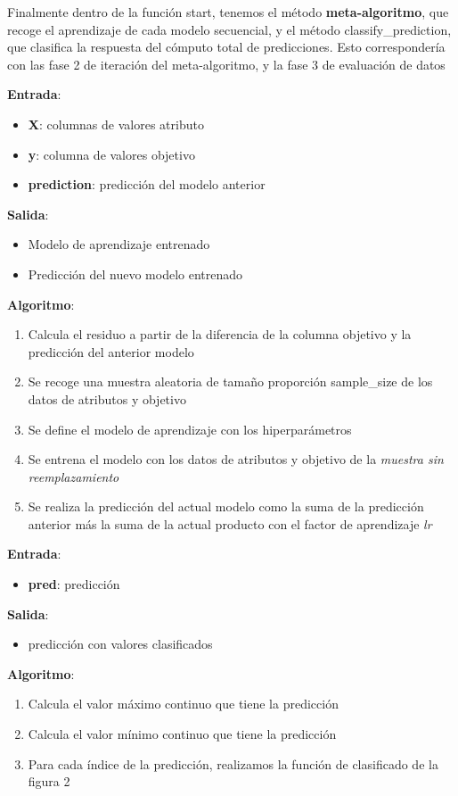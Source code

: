 \documentclass[conference,a4paper]{IEEEtran}
\begin{document}
Finalmente dentro de la función start, tenemos el método \textbf{meta-algoritmo}, que recoge el aprendizaje de cada modelo secuencial, y el método classify\_prediction, que clasifica la respuesta del cómputo total de predicciones. Esto correspondería con las fase 2 de iteración del meta-algoritmo, y la fase 3 de evaluación de datos \\

\begin{textb}
    \textbf{Entrada}:
    \begin{itemize}
    \item \textbf{X}: columnas de valores atributo
    \item \textbf{y}: columna de valores objetivo
    \item \textbf{prediction}: predicción del modelo anterior
\end{itemize}
\textbf{Salida}:
\begin{itemize}
    \item Modelo de aprendizaje entrenado
    \item Predicción del nuevo modelo entrenado
\end{itemize}
\textbf{Algoritmo}:
\begin{enumerate}
    \item Calcula el residuo a partir de la diferencia de la columna objetivo y la predicción del anterior modelo
    \item Se recoge una muestra aleatoria de tamaño proporción sample\_size de los datos de atributos y objetivo
    \item Se define el modelo de aprendizaje con los hiperparámetros
    \item Se entrena el modelo con los datos de atributos y objetivo de la \textit{muestra sin reemplazamiento}
    \item Se realiza la predicción del actual modelo como la suma de la predicción anterior más la suma de la actual producto con el factor de aprendizaje \textit{lr}
\end{enumerate}
\end{textb}

\begin{textb}
    \textbf{Entrada}:
    \begin{itemize}
    \item \textbf{pred}: predicción
\end{itemize}
\textbf{Salida}:
\begin{itemize}
    \item predicción con valores clasificados
\end{itemize}
\textbf{Algoritmo}:
\begin{enumerate}
    \item Calcula el valor máximo continuo que tiene la predicción
    \item Calcula el valor mínimo continuo que tiene la predicción
    \item Para cada índice de la predicción, realizamos la función de clasificado de la figura 2
\end{enumerate}
\end{textb}
\end{document}
